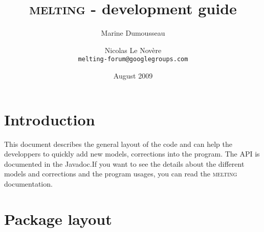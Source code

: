 \documentclass{article}
\begin{document}
\title{\textsc{melting} - development guide}
\author{Marine Dumousseau \and Nicolas Le Nov\`ere \\
  \texttt{melting-forum@googlegroups.com}}
\date{August 2009}
\maketitle

\newpage

\tableofcontents

\newpage

\section{Introduction}

This document describes the general layout of the code and can help the developpers
to quickly add new models, corrections into the program. The API is documented in the 
Javadoc.If you want to see the details about the different models and corrections and 
the program usages, you can read the \textsc{melting} documentation. 

\section{Package layout}
\end{document}
